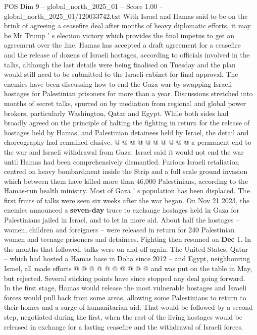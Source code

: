 \begin{textsample}{POS Dim 9 – global\_north\_2025\_01 – Score 1.00 – global\_north\_2025\_01/120033742.txt}  \label{ex:f9_pos_357}
With Israel and Hamas said to be on the brink of agreeing a ceasefire deal after months of heavy diplomatic efforts, it may be Mr Trump ' s election victory which provides the final impetus to get an agreement over the line.
Hamas has accepted a draft agreement for a ceasefire and the release of dozens of Israeli hostages, according to officials involved in the talks, although the last details were being finalised on Tuesday and the plan would still need to be submitted to the Israeli cabinet for final approval.
The enemies have been discussing how to end the Gaza war by swapping Israeli hostages for Palestinian prisoners for more than a year.
Discussions stretched into months of secret talks, spurred on by mediation from regional and global power brokers, particularly Washington, Qatar and Egypt.
While both sides had broadly agreed on the principle of halting the fighting in return for the release of hostages held by Hamas, and Palestinian detainees held by Israel, the detail and choreography had remained elusive. @ @ @ @ @ @ @ @ @ @ a permanent end to the war and Israeli withdrawal from Gaza.
Israel said it would not end the war until Hamas had been comprehensively dismantled.
Furious Israeli retaliation centred on heavy bombardment inside the Strip and a full scale ground invasion which between them have killed more than 46,000 Palestinians, according to the Hamas-run health ministry.
Most of Gaza ' s population has been displaced.
The first fruits of talks were seen six weeks after the war began.
On Nov 21 2023, the enemies announced a \textbf{seven-day} truce to exchange hostages held in Gaza for Palestinians jailed in Israel, and to let in more aid.
About half the hostages -- women, children and foreigners -- were released in return for 240 Palestinian women and teenage prisoners and detainees.
Fighting then resumed on \textbf{Dec} 1.
In the months that followed, talks were on and off again.
The United States, Qatar -- which had hosted a Hamas base in Doha since 2012 -- and Egypt, neighbouring Israel, all made efforts @ @ @ @ @ @ @ @ @ @ and was put on the table in May, but rejected.
Several sticking points have since stopped any deal going forward.
In the first stage, Hamas would release the most vulnerable hostages and Israeli forces would pull back from some areas, allowing some Palestinians to return to their homes and a surge of humanitarian aid.
That would be followed by a second step, negotiated during the first, when the rest of the living hostages would be released in exchange for a lasting ceasefire and the withdrawal of Israeli forces.

\end{textsample}

